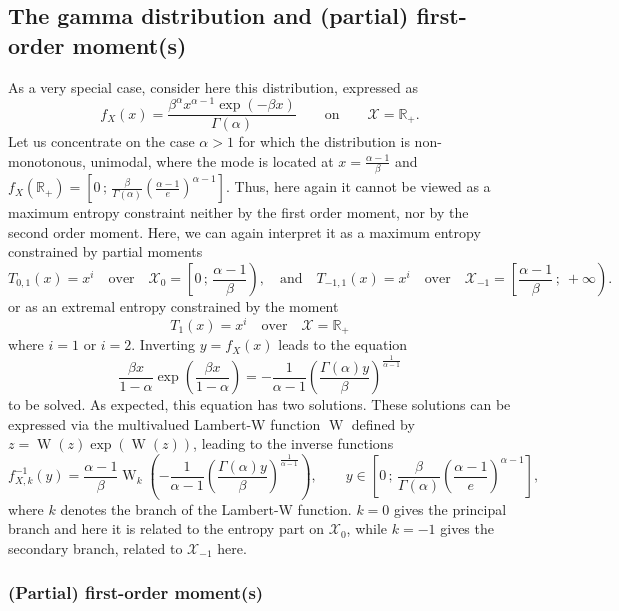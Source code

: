 \documentclass[english]{elsarticle}
\theoremstyle{definition}
\theoremstyle{plain}
\theoremstyle{plain}
\def\Rset{\mathbb{R}}
\def\X{\mathcal{X}}
\def\W{\operatorname{W}}
\begin{document}
\subsection{The gamma distribution and (partial) first-order moment(s)}

\label{subsec:GammaFirstOrder}

As a very special case, consider here this distribution, expressed
as 
\[
f_{X}(x)=\frac{\beta^{\alpha}x^{\alpha-1}\exp(-\beta x)}{\Gamma(\alpha)}\qquad\mbox{on}\qquad\X=\Rset_{+}.
\]
Let us concentrate on the case $\alpha>1$ for which the distribution
is non-monotonous, unimodal, where the mode is located at $x=\frac{\alpha-1}{\beta}$
and $f_{X}(\Rset_{+})=\left[0\,;\,\frac{\beta}{\Gamma(\alpha)}\left(\frac{\alpha-1}{e}\right)^{\alpha-1}\right]$.
Thus, here again it cannot be viewed as a maximum entropy constraint
neither by the first order moment, nor by the second order moment.
Here, we can again interpret it as a maximum entropy constrained by
partial moments 
\[
T_{0,1}(x)=x^{i}\quad\mbox{over}\quad\X_{0}=\left[0\,;\,\frac{\alpha-1}{\beta}\right),\quad\mbox{and}\quad T_{-1,1}(x)=x^{i}\quad\mbox{over}\quad\X_{-1}=\left[\frac{\alpha-1}{\beta}\,;\:+\infty\right).
\]
or as an extremal entropy constrained by the moment 
\[
T_{1}(x)=x^{i}\quad\mbox{over}\quad\X=\Rset_{+}
\]
where $i=1$ or $i=2$. Inverting $y=f_{X}(x)$ leads to the equation
\[
\frac{\beta x}{1-\alpha}\exp\left(\frac{\beta x}{1-\alpha}\right)=-\frac{1}{\alpha-1}\left(\frac{\Gamma(\alpha)y}{\beta}\right)^{\frac{1}{\alpha-1}}
\]
to be solved. As expected, this equation has two solutions. These
solutions can be expressed via the multivalued Lambert-W function
$\W$ defined by $z=\W(z)\exp(\W(z))$, leading to the inverse functions
\[
f_{X,k}^{-1}(y)=\frac{\alpha-1}{\beta}\W_{k}\left(-\frac{1}{\alpha-1}\left(\frac{\Gamma(\alpha)y}{\beta}\right)^{\frac{1}{\alpha-1}}\right),\qquad y\in\left[0\,;\,\frac{\beta}{\Gamma(\alpha)}\left(\frac{\alpha-1}{e}\right)^{\alpha-1}\right],
\]
where $k$ denotes the branch of the Lambert-W function. $k=0$ gives
the principal branch and here it is related to the entropy part on
$\X_{0}$, while $k=-1$ gives the secondary branch, related to $\X_{-1}$
here.




\subsubsection{(Partial) first-order moment(s)}
\end{document}
